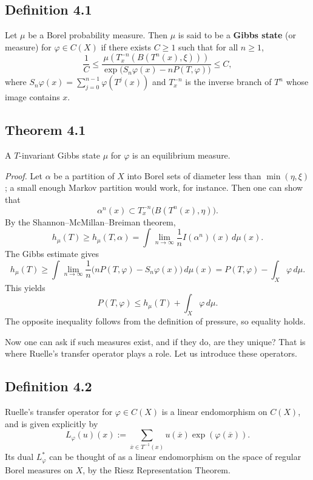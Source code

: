 \documentclass[11pt,a4paper]{article}
\begin{document}
\subsection*{Definition 4.1}
Let $\mu$ be a Borel probability measure. Then $\mu$ is said to be a \textbf{Gibbs state} (or measure) for $\varphi\in C(X)$ if there exists $C\geq1$ such that for all $n\geq1$,
\[
\frac{1}{C}\leq
\frac{\mu(T_x^{-n}(B(T^n(x),\xi)))}
{\exp\big(S_n\varphi(x)-nP(T,\varphi)\big)}
\leq C,
\]
where $S_n\varphi(x)=\sum_{j=0}^{n-1}\varphi(T^j(x))$ and $T_x^{-n}$ is the inverse branch of $T^n$ whose image contains $x$.

\subsection*{Theorem 4.1}
A $T$-invariant Gibbs state $\mu$ for $\varphi$ is an equilibrium measure.

\textit{Proof.}
Let $\alpha$ be a partition of $X$ into Borel sets of diameter less than $\min(\eta,\xi)$; a small enough Markov partition would work, for instance. Then one can show that
\[
\alpha^n(x)\subset T_x^{-n}\bigl(B(T^n(x),\eta)\bigr).
\]
By the Shannon--McMillan--Breiman theorem,
\[
h_\mu(T)\geq h_\mu(T,\alpha)
=\int\lim_{n\to\infty}\frac1n I(\alpha^n)(x)\,d\mu(x).
\]
The Gibbs estimate gives
\[
h_\mu(T)
\geq\int\lim_{n\to\infty}\frac1n
\bigl(nP(T,\varphi)-S_n\varphi(x)\bigr)\,d\mu(x)
=P(T,\varphi)-\int_X\varphi\,d\mu.
\]
This yields
\[
P(T,\varphi)\leq h_\mu(T)+\int_X\varphi\,d\mu.
\]
The opposite inequality follows from the definition of pressure, so equality holds.

Now one can ask if such measures exist, and if they do, are they unique?
That is where Ruelle's transfer operator plays a role. Let us introduce these
operators.

\subsection*{Definition 4.2}
Ruelle's transfer operator for $\varphi\in C(X)$ is a linear endomorphism on $C(X)$, and is given explicitly by
\[
L_{\varphi}(u)(x):=
\sum_{\overline{x}\in T^{-1}(x)}
u(\overline{x})\exp(\varphi(\overline{x})).
\]
Its dual $L_{\varphi}^*$ can be thought of as a linear endomorphism on the
space of regular Borel measures on $X$, by the Riesz Representation Theorem.
\end{document}
